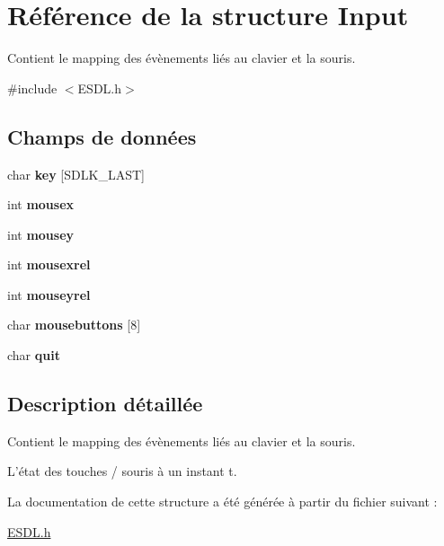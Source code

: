 \hypertarget{struct_input}{\section{Référence de la structure Input}
\label{struct_input}
}


Contient le mapping des évènements liés au clavier et la souris.  




{\ttfamily \#include $<$E\+S\+D\+L.\+h$>$}

\subsection*{Champs de données}
\begin{DoxyCompactItemize}
\item 
\hypertarget{struct_input_a211bceabbcc2ccdd710502d596692ab5}{char {\bfseries key} \mbox{[}S\+D\+L\+K\+\_\+\+L\+A\+S\+T\mbox{]}}\label{struct_input_a211bceabbcc2ccdd710502d596692ab5}

\item 
\hypertarget{struct_input_a332eaea23f6cb9689caaa189b11efef7}{int {\bfseries mousex}}\label{struct_input_a332eaea23f6cb9689caaa189b11efef7}

\item 
\hypertarget{struct_input_a8ef4889d960150cf103f78639584c73b}{int {\bfseries mousey}}\label{struct_input_a8ef4889d960150cf103f78639584c73b}

\item 
\hypertarget{struct_input_af80e916ff6c3b891d61f39a89ad12aa8}{int {\bfseries mousexrel}}\label{struct_input_af80e916ff6c3b891d61f39a89ad12aa8}

\item 
\hypertarget{struct_input_a59f556c09868f3358e3716e5968f9965}{int {\bfseries mouseyrel}}\label{struct_input_a59f556c09868f3358e3716e5968f9965}

\item 
\hypertarget{struct_input_ade8f5116b1a4c052fd39f50c849a3be6}{char {\bfseries mousebuttons} \mbox{[}8\mbox{]}}\label{struct_input_ade8f5116b1a4c052fd39f50c849a3be6}

\item 
\hypertarget{struct_input_a64fa5d631e4b6f767d8c3dfede7126c3}{char {\bfseries quit}}\label{struct_input_a64fa5d631e4b6f767d8c3dfede7126c3}

\end{DoxyCompactItemize}


\subsection{Description détaillée}
Contient le mapping des évènements liés au clavier et la souris. 

L'état des touches / souris à un instant t. 

La documentation de cette structure a été générée à partir du fichier suivant \+:\begin{DoxyCompactItemize}
\item 
\hyperlink{_e_s_d_l_8h}{E\+S\+D\+L.\+h}\end{DoxyCompactItemize}
